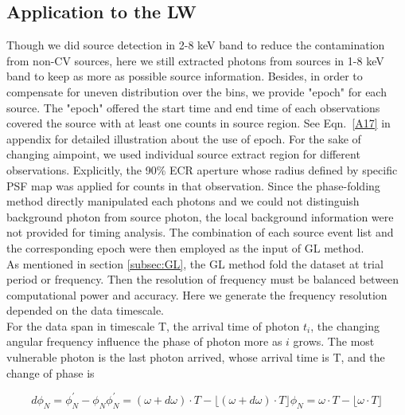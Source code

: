 \documentclass[twoside,twocolumn]{aastex63}
\begin{document}
\subsection{Application to the LW}\label{subsec:appli}
Though we did source detection in 2-8 keV band to reduce the contamination from non-CV sources, here we still extracted photons from sources in 1-8 keV band to keep as more as possible source information. 
Besides, in order to compensate for uneven distribution over the bins, we provide "epoch" for each source. The "epoch" offered the start time and end time of each observations covered the source with at least one counts in source region. See Eqn.~\ref{A17} in appendix for detailed illustration about the use of epoch. 
For the sake of changing aimpoint, we used individual source extract region for different observations. Explicitly, the 90\% ECR aperture  whose radius defined by specific PSF map was applied for counts in that observation. Since the phase-folding method directly manipulated each photons and we could not distinguish background photon from source photon, the local background information were not provided for timing analysis. The combination of each source event list and the corresponding epoch were then employed as the input of GL method. 
\\
\indent
As mentioned in section \ref{subsec:GL}, the GL method fold the dataset at trial period or frequency. Then the resolution of frequency must be balanced between computational power and  accuracy. Here we generate the frequency resolution depended on the data timescale.
\\
\indent
For the data span in timescale T, the arrival time of photon $t_i$, the changing angular frequency influence the phase of photon more as $i$ grows. The most vulnerable photon is the last photon arrived, whose arrival time is T, and the change of phase is 

\begin{subequations}\label{fi}
\begin{equation}
	d\phi_{N}=\phi_{N}^{'}-\phi_{N}
\end{equation}
\begin{equation}
	\phi_{N}^{'}=(\omega +d\omega) \cdot T-\lfloor (\omega +d\omega) \cdot T \rfloor
\end{equation}
\begin{equation}
	\phi_{N}=\omega \cdot T-\lfloor \omega \cdot T \rfloor
\end{equation}
\end{subequations}
\\
\end{document}
